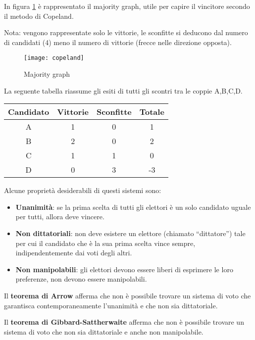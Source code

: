 In figura \ref{fig:copeland} è rappresentato il majority graph, utile
per capire il vincitore secondo il metodo di Copeland.

Nota: vengono rappresentate solo le vittorie, le sconfitte si deducono dal
numero di candidati (4) meno il numero di vittorie (frecce nelle direzione
opposta).

\begin{figure}[H]
\centering
\texttt{[image: copeland]}
\caption{Majority graph}
\label{fig:copeland}
\end{figure}

La seguente tabella riassume gli esiti di tutti gli scontri tra le coppie
A,B,C,D.

\begin{table}[H]
\begin{tabular}{|c|c|c|c|}
\hline
\textbf{Candidato} & \textbf{Vittorie} & \textbf{Sconfitte} & \textbf{Totale} \\
\hline
A & 1 & 0 & 1 \\ \hline
B & 2 & 0 & 2 \\ \hline
C & 1 & 1 & 0 \\ \hline
D & 0 & 3 & -3 \\ \hline
\end{tabular}
\end{table}

Alcune proprietà desiderabili di questi sistemi sono:

\begin{itemize}
 \item \textbf{Unanimità}: se la prima scelta di tutti gli elettori è
un solo candidato uguale per tutti, allora deve vincere.
 \item \textbf{Non dittatoriali}: non deve esistere un elettore (chiamato
``dittatore'') tale per cui il candidato che è la sua prima scelta vince 
sempre, indipendentemente dai voti degli altri.
 \item \textbf{Non manipolabili}: gli elettori devono essere liberi di
esprimere le loro preferenze, non devono essere manipolabili.
\end{itemize}

Il \textbf{teorema di Arrow} afferma che non è possibile trovare un sistema di 
voto che garantisca contemporaneamente l'unanimità e che non sia dittatoriale.

Il \textbf{teorema di Gibbard-Sattherwaite} afferma che non è possibile trovare
un sistema di voto che non sia dittatoriale e anche non manipolabile.

